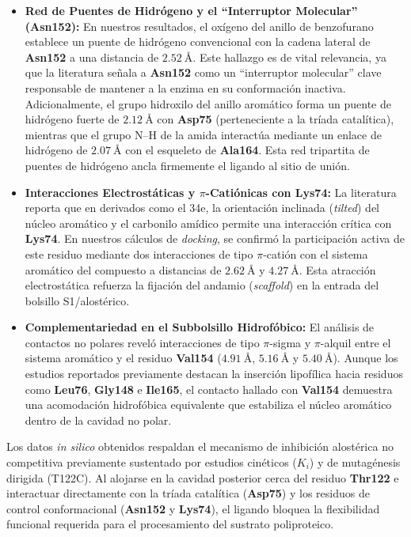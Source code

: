 \begin{itemize}
    \item \textbf{Red de Puentes de Hidrógeno y el ``Interruptor Molecular'' (\textbf{Asn152}):} En nuestros resultados, el oxígeno del anillo de benzofurano establece un puente de hidrógeno convencional con la cadena lateral de \textbf{Asn152} a una distancia de $2.52\ \text{\AA}$. Este hallazgo es de vital relevancia, ya que la literatura señala a \textbf{Asn152} como un ``interruptor molecular'' clave responsable de mantener a la enzima en su conformación inactiva. Adicionalmente, el grupo hidroxilo del anillo aromático forma un puente de hidrógeno fuerte de $2.12\ \text{\AA}$ con \textbf{Asp75} (perteneciente a la tríada catalítica), mientras que el grupo N--H de la amida interactúa mediante un enlace de hidrógeno de $2.07\ \text{\AA}$ con el esqueleto de \textbf{Ala164}. Esta red tripartita de puentes de hidrógeno ancla firmemente el ligando al sitio de unión.
    
    \item \textbf{Interacciones Electrostáticas y $\pi$-Catiónicas con \textbf{Lys74}:} La literatura reporta que en derivados como el 34e, la orientación inclinada (\textit{tilted}) del núcleo aromático y el carbonilo amídico permite una interacción crítica con \textbf{Lys74}. En nuestros cálculos de \textit{docking}, se confirmó la participación activa de este residuo mediante dos interacciones de tipo $\pi$-catión con el sistema aromático del compuesto a distancias de $2.62\ \text{\AA}$ y $4.27\ \text{\AA}$. Esta atracción electrostática refuerza la fijación del andamio (\textit{scaffold}) en la entrada del bolsillo S1/alostérico.
    
    \item \textbf{Complementariedad en el Subbolsillo Hidrofóbico:} El análisis de contactos no polares reveló interacciones de tipo $\pi$-sigma y $\pi$-alquil entre el sistema aromático y el residuo \textbf{Val154} ($4.91\ \text{\AA}$, $5.16\ \text{\AA}$ y $5.40\ \text{\AA}$). Aunque los estudios reportados previamente destacan la inserción lipofílica hacia residuos como \textbf{Leu76}, \textbf{Gly148} e \textbf{Ile165}, el contacto hallado con \textbf{Val154} demuestra una acomodación hidrofóbica equivalente que estabiliza el núcleo aromático dentro de la cavidad no polar.
\end{itemize}

Los datos \textit{in silico} obtenidos respaldan el mecanismo de inhibición alostérica no competitiva previamente sustentado por estudios cinéticos ($K_i$) y de mutagénesis dirigida (T122C). Al alojarse en la cavidad posterior cerca del residuo \textbf{Thr122} e interactuar directamente con la tríada catalítica (\textbf{Asp75}) y los residuos de control conformacional (\textbf{Asn152} y \textbf{Lys74}), el ligando bloquea la flexibilidad funcional requerida para el procesamiento del sustrato poliproteico.

